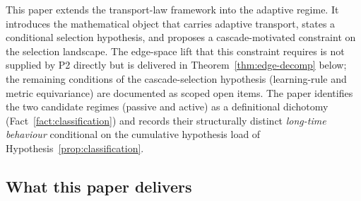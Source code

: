 \documentclass[11pt]{article}
\theoremstyle{definition}
\begin{document}
This paper extends the transport-law framework into the adaptive regime. It introduces the mathematical object that carries adaptive transport, states a conditional selection hypothesis, and proposes a cascade-motivated constraint on the selection landscape. The edge-space lift that this constraint requires is not supplied by P2 directly but is delivered in Theorem~\ref{thm:edge-decomp} below; the remaining conditions of the cascade-selection hypothesis (learning-rule and metric equivariance) are documented as scoped open items. The paper identifies the two candidate regimes (passive and active) as a definitional dichotomy (Fact~\ref{fact:classification}) and records their structurally distinct \emph{long-time behaviour} conditional on the cumulative hypothesis load of Hypothesis~\ref{prop:classification}.

\subsection{What this paper delivers}
\end{document}
